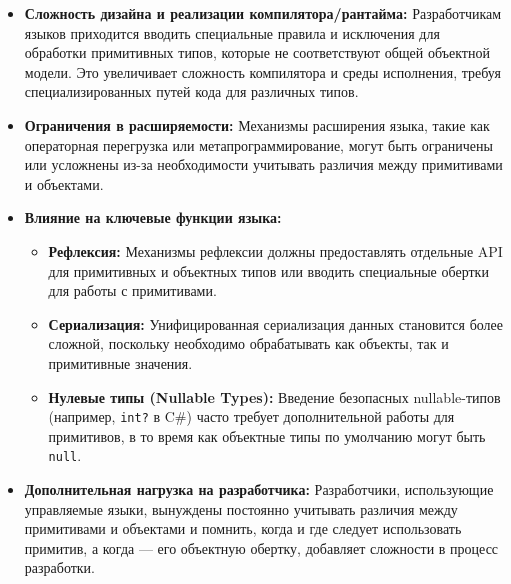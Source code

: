\begin{itemize}[leftmargin=*,nosep]
    \item \textbf{Сложность дизайна и реализации компилятора/рантайма:} Разработчикам языков приходится вводить специальные правила и исключения для обработки примитивных типов, которые не соответствуют общей объектной модели. Это увеличивает сложность компилятора и среды исполнения, требуя специализированных путей кода для различных типов.

    \item \textbf{Ограничения в расширяемости:} Механизмы расширения языка, такие как операторная перегрузка или метапрограммирование, могут быть ограничены или усложнены из-за необходимости учитывать различия между примитивами и объектами.

    \item \textbf{Влияние на ключевые функции языка:}
    \begin{itemize}
        \item \textbf{Рефлексия:} Механизмы рефлексии должны предоставлять отдельные API для примитивных и объектных типов или вводить специальные обертки для работы с примитивами.
        \item \textbf{Сериализация:} Унифицированная сериализация данных становится более сложной, поскольку необходимо обрабатывать как объекты, так и примитивные значения.
        \item \textbf{Нулевые типы (Nullable Types):} Введение безопасных nullable-типов (например, \texttt{int?} в C\#) часто требует дополнительной работы для примитивов, в то время как объектные типы по умолчанию могут быть \texttt{null}.
    \end{itemize}

    \item \textbf{Дополнительная нагрузка на разработчика:} Разработчики, использующие управляемые языки, вынуждены постоянно учитывать различия между примитивами и объектами и помнить, когда и где следует использовать примитив, а когда — его объектную обертку, добавляет сложности в процесс разработки.
\end{itemize}

